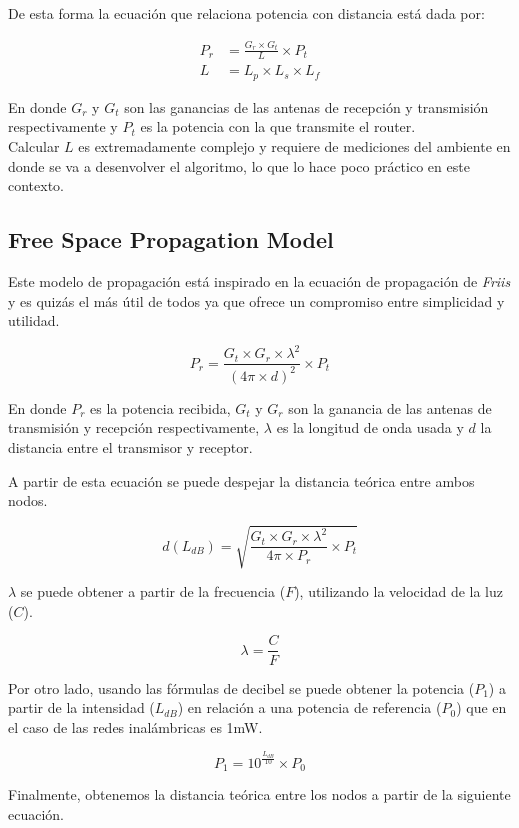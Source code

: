 \documentclass[journal]{IEEEtran}
\begin{document}
De esta forma la ecuación que relaciona potencia con distancia está dada por:

\begin{align*}
P_r &= {\frac {G_r \times G_t} {L}} \times P_t\\
L &= L_p \times L_s \times L_f
\end{align*}

En donde $G_r$ y $G_t$ son las ganancias de las antenas de recepción y transmisión respectivamente y $P_t$ es la potencia con la que transmite el router.\\

Calcular $L$ es extremadamente complejo y requiere de mediciones del ambiente en donde se va a desenvolver el algoritmo, lo que lo hace poco práctico en este contexto.

\subsection{Free Space Propagation Model}

Este modelo de propagación está inspirado en la ecuación de propagación de \emph{Friis} \cite{friis:transmission:equation} y es quizás el más útil de todos ya que ofrece un compromiso entre simplicidad y utilidad.

$$P_r = \frac {G_t \times G_r \times \lambda^2} {(4 \pi \times d)^2} \times P_t$$

En donde $P_r$ es la potencia recibida, $G_t$ y $G_r$ son la ganancia de las antenas de transmisión y recepción respectivamente, $\lambda$ es la longitud de onda usada y $d$ la distancia entre el transmisor y receptor.

A partir de esta ecuación se puede despejar la distancia teórica entre ambos nodos.

$$d(L_{dB}) = \sqrt {\frac {G_t \times G_r \times \lambda^2} {4 \pi \times P_r} \times P_t}$$

$\lambda$ se puede obtener a partir de la frecuencia ($F$), utilizando la velocidad de la luz ($C$).

$$\lambda = \frac {C} {F}$$

Por otro lado, usando las fórmulas de decibel se puede obtener la potencia ($P_1$) a partir de la intensidad ($L_{dB}$) en relación a una potencia de referencia ($P_0$) que en el caso de las redes inalámbricas es 1mW.

$$P_1 = 10^{\frac {L_{dB}} {10}} \times P_0$$

Finalmente, obtenemos la distancia teórica entre los nodos a partir de la siguiente ecuación.
\end{document}
